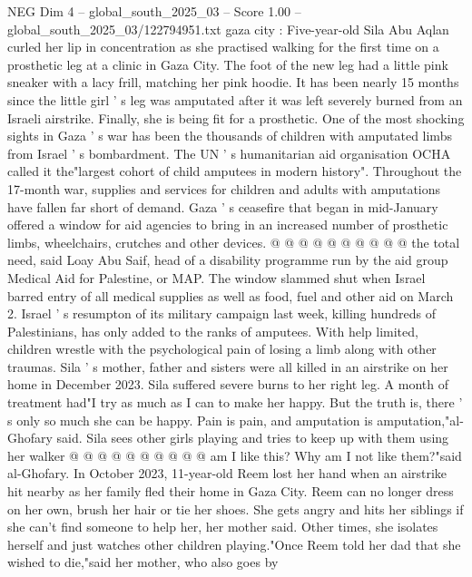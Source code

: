 \begin{textsample}{NEG Dim 4 – global\_south\_2025\_03 – Score 1.00 – global\_south\_2025\_03/122794951.txt}  \label{ex:f4_neg_425}
gaza city : Five-year-old Sila Abu Aqlan curled her lip in concentration as she practised walking for the first time on a prosthetic leg at a clinic in Gaza City.
The foot of the new leg had a little pink sneaker with a lacy frill, matching her pink hoodie.
It has been nearly 15 months since the little girl ' s leg was amputated after it was left severely burned from an Israeli airstrike.
Finally, she is being fit for a prosthetic.
One of the most shocking sights in Gaza ' s war has been the thousands of children with amputated limbs from Israel ' s bombardment.
The UN ' s humanitarian aid organisation OCHA called it the"largest cohort of child amputees in modern history".
Throughout the 17-month war, supplies and services for children and adults with amputations have fallen far short of demand.
Gaza ' s ceasefire that began in mid-January offered a window for aid agencies to bring in an increased number of prosthetic limbs, wheelchairs, crutches and other devices. @ @ @ @ @ @ @ @ @ @ the total need, said Loay Abu Saif, head of a disability programme run by the aid group Medical Aid for Palestine, or MAP.
The window slammed shut when Israel barred entry of all medical supplies as well as food, fuel and other aid on March 2.
Israel ' s resumpton of its military campaign last week, killing hundreds of Palestinians, has only added to the ranks of amputees.
With help limited, children wrestle with the psychological pain of losing a limb along with other traumas.
Sila ' s mother, father and sisters were all killed in an airstrike on her home in December 2023.
Sila suffered severe burns to her right leg.
A month of treatment had"I try as much as I can to make her happy.
But the truth is, there ' s only so much she can be happy.
Pain is pain, and amputation is amputation,"al-Ghofary said.
Sila sees other girls playing and tries to keep up with them using her walker @ @ @ @ @ @ @ @ @ @ am I like this?
Why am I not like them?"said al-Ghofary.
In October 2023, 11-year-old Reem lost her hand when an airstrike hit nearby as her family fled their home in Gaza City.
Reem can no longer dress on her own, brush her hair or tie her shoes.
She gets angry and hits her siblings if she can't find someone to help her, her mother said.
Other times, she isolates herself and just watches other children playing."Once Reem told her dad that she wished to die,"said her mother, who also goes by

\end{textsample}
